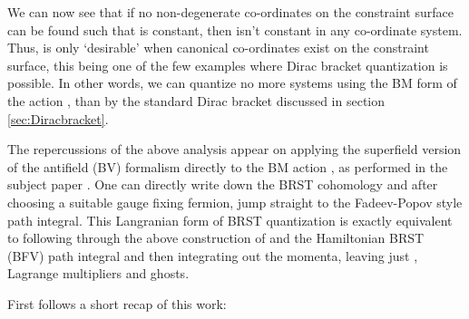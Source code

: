 \documentclass[a4paper,12pt]{article}
\theoremstyle{definition}
\theoremstyle{remark}
\numberwithin{equation}{section}
\providecommand{\al}{\alpha}
\providecommand{\be}{\beta}
\providecommand{\om}{\omega}
\providecommand{\bx}{\bar{x}}
\begin{document}
We can now see that if no non-degenerate co-ordinates \coordHE{} on
the constraint surface \myHighlight{$\Gamma$}\coordHE{} can be found such that
\myHighlight{$\om_{\mu\nu}(y)$}\coordHE{} is constant, then \myHighlight{$\om_{(p_\al,x^i),(p_\be,x^j)}$}\coordHE{}
isn't constant in any co-ordinate system. Thus, \myHighlight{$S[\bx(x)]$}\coordHE{} is only
`desirable' when canonical co-ordinates \coordHE{} exist on the
constraint surface, this being one of the few examples where Dirac
bracket quantization is possible. In other words, we can quantize
no more systems using the BM form of the action \myHighlight{$S[\bx(x)]$}\coordHE{}, than
by the standard Dirac bracket discussed in section
\ref{sec:Diracbracket}.

The repercussions of the above analysis appear on applying the
superfield version of the antifield (BV) formalism directly to the
BM action \myHighlight{$S[\bx(x)]$}\coordHE{}, as performed in the subject paper
\cite{Batalin:2001hs}. One can directly write down the BRST
cohomology and after choosing a suitable gauge fixing fermion, jump
straight to the Fadeev-Popov style path integral. This Langranian
form of BRST quantization is exactly equivalent to following
through the above construction of \coordHE{} and the Hamiltonian
BRST (BFV) path integral and then integrating out the momenta,
leaving just \coordHE{}, Lagrange multipliers and ghosts.

First follows a short recap of this work:
\end{document}
